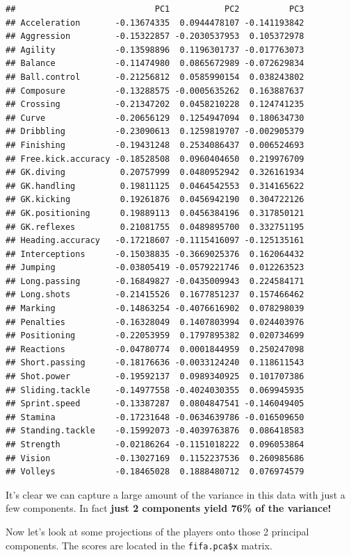 \documentclass[
]{article}
\theoremstyle{definition}
\theoremstyle{definition}
\theoremstyle{definition}
\theoremstyle{definition}
\theoremstyle{remark}
\begin{document}
\begin{verbatim}
##                            PC1           PC2          PC3
## Acceleration       -0.13674335  0.0944478107 -0.141193842
## Aggression         -0.15322857 -0.2030537953  0.105372978
## Agility            -0.13598896  0.1196301737 -0.017763073
## Balance            -0.11474980  0.0865672989 -0.072629834
## Ball.control       -0.21256812  0.0585990154  0.038243802
## Composure          -0.13288575 -0.0005635262  0.163887637
## Crossing           -0.21347202  0.0458210228  0.124741235
## Curve              -0.20656129  0.1254947094  0.180634730
## Dribbling          -0.23090613  0.1259819707 -0.002905379
## Finishing          -0.19431248  0.2534086437  0.006524693
## Free.kick.accuracy -0.18528508  0.0960404650  0.219976709
## GK.diving           0.20757999  0.0480952942  0.326161934
## GK.handling         0.19811125  0.0464542553  0.314165622
## GK.kicking          0.19261876  0.0456942190  0.304722126
## GK.positioning      0.19889113  0.0456384196  0.317850121
## GK.reflexes         0.21081755  0.0489895700  0.332751195
## Heading.accuracy   -0.17218607 -0.1115416097 -0.125135161
## Interceptions      -0.15038835 -0.3669025376  0.162064432
## Jumping            -0.03805419 -0.0579221746  0.012263523
## Long.passing       -0.16849827 -0.0435009943  0.224584171
## Long.shots         -0.21415526  0.1677851237  0.157466462
## Marking            -0.14863254 -0.4076616902  0.078298039
## Penalties          -0.16328049  0.1407803994  0.024403976
## Positioning        -0.22053959  0.1797895382  0.020734699
## Reactions          -0.04780774  0.0001844959  0.250247098
## Short.passing      -0.18176636 -0.0033124240  0.118611543
## Shot.power         -0.19592137  0.0989340925  0.101707386
## Sliding.tackle     -0.14977558 -0.4024030355  0.069945935
## Sprint.speed       -0.13387287  0.0804847541 -0.146049405
## Stamina            -0.17231648 -0.0634639786 -0.016509650
## Standing.tackle    -0.15992073 -0.4039763876  0.086418583
## Strength           -0.02186264 -0.1151018222  0.096053864
## Vision             -0.13027169  0.1152237536  0.260985686
## Volleys            -0.18465028  0.1888480712  0.076974579
\end{verbatim}

It's clear we can capture a large amount of the variance in this data with just a few components. In fact \textbf{just 2 components yield 76\% of the variance!}

Now let's look at some projections of the players onto those 2 principal components. The scores are located in the \texttt{fifa.pca\$x} matrix.
\end{document}
